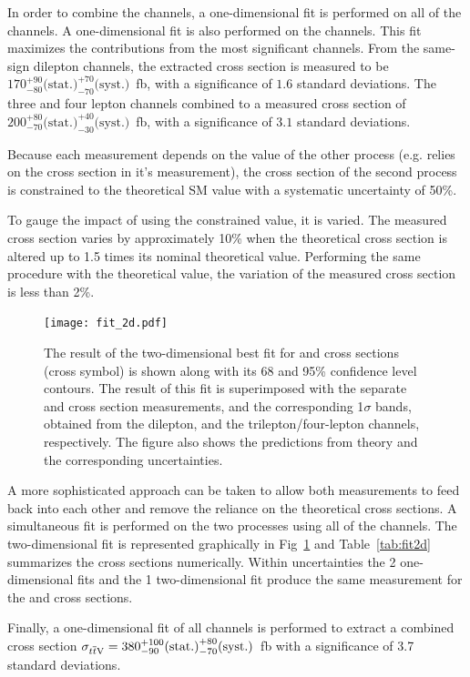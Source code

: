 In order to combine the \ttZ channels, a one-dimensional fit is performed on all of the channels. A one-dimensional fit is also performed on the \ttW channels. This fit maximizes the contributions from the most significant channels. From the same-sign dilepton channels, the extracted \ttW cross section is measured to be  $170 ^{+90}_{-80} \textrm{(stat.)} ^{+70}_{-70} \textrm{(syst.)}$~fb, with a significance of $1.6$ standard deviations. The three and four lepton channels combined to a measured \ttZ cross section of 
$200 ^{+80}_{-70} \textrm{(stat.)} ^{+40}_{-30} \textrm{(syst.)}$~fb, with a significance of $3.1$ standard deviations. 

Because each measurement depends on the value of the other process (e.g. \ttZ relies on the \ttW cross section in it's measurement), the cross section of the second process is constrained to the theoretical SM value with a systematic uncertainty of 50\%.

To gauge the impact of using the constrained value, it is varied. The measured \ttW cross section varies by approximately 10\% 
when the theoretical \ttZ cross section is altered up to 1.5 times its nominal theoretical value.  
Performing the same procedure with the \ttW theoretical value, the variation of the measured \ttZ cross section 
is less than 2\%. 

\begin{figure}[!h]
\texttt{[image: fit\_2d.pdf]}
\caption{\label{fig:combination_2d} The result of the two-dimensional best fit for \ttW and \ttZ{} cross sections 
(cross symbol) 
is shown along with its 68 and 95\% confidence level contours. The result of this fit is superimposed with the 
separate \ttW and \ttZ{} cross section measurements, and the corresponding 1$\sigma$ bands, obtained 
from the dilepton, and the trilepton/four-lepton channels, respectively. The figure also shows the 
predictions from theory and the corresponding uncertainties.}
\end{figure}

A more sophisticated approach can be taken to allow both measurements to feed back into each other and remove the reliance on the theoretical cross sections. A simultaneous fit is performed on the two processes using all of the channels. The two-dimensional fit is represented graphically in Fig~\ref{fig:combination_2d} and Table~\ref{tab:fit2d} summarizes the cross sections numerically. Within uncertainties the 2 one-dimensional fits and the 1 two-dimensional fit produce the same measurement for the \ttZ and \ttW cross sections.



%
Finally, a one-dimensional fit of all channels is performed to extract a combined cross section 
$\sigma_{\relax{t}\overline{\relax{t}}\textrm{V}} = 380 ^{+100}_{-90} \textrm{(stat.)} ^{+80}_{-70} \textrm{(syst.)}$~fb 
with a significance of 3.7 standard deviations. 
%

 
	